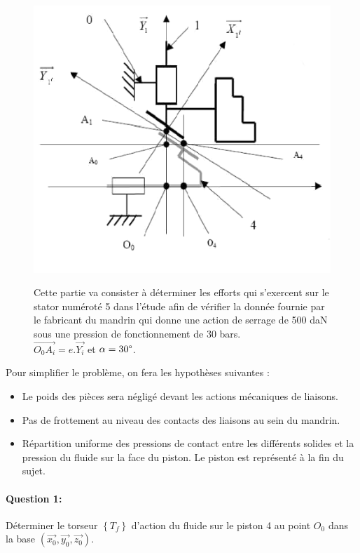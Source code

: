 \begin{figure}[!h]
  \begin{minipage}{0.48\linewidth}
  \centering\includegraphics[width=.9\linewidth]{img/mandrin_cin.png}
  \end{minipage}
  \hfill
  \begin{minipage}{0.48\linewidth}
Cette partie va consister à déterminer les efforts qui s'exercent sur le stator numéroté 5 dans l'étude afin de vérifier la donnée fournie par le fabricant du mandrin qui donne une action de serrage de 500 daN sous une pression de fonctionnement de 30 bars. \\
$\overrightarrow{O_0A_i}=e.\overrightarrow{Y_i}$ et $\alpha=30\degree$.
 \end{minipage}
\end{figure}

Pour simplifier le problème, on fera les hypothèses suivantes : 
\begin{itemize}
 \item Le poids des pièces sera négligé devant les actions mécaniques de liaisons. 
 \item Pas de frottement au niveau des contacts des liaisons au sein du mandrin. 
 \item Répartition uniforme des pressions de contact entre les différents solides et la pression du fluide sur la face du piston. Le piston est représenté à la fin du sujet.
\end{itemize}

\paragraph{Question 1:} Déterminer le torseur $\left\{T_f\right\}$ d'action du fluide sur le piston 4 au point $O_0$ dans la base $(\overrightarrow{x_0},\overrightarrow{y_0},\overrightarrow{z_0})$.

